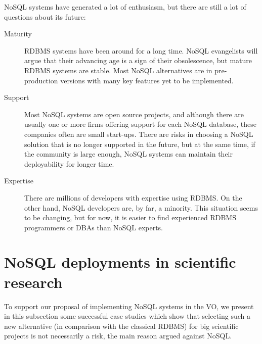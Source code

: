 NoSQL systems have generated a lot of enthusiasm, but there are still a lot of questions about its future:

\begin{description} %

\item[Maturity] %

RDBMS systems have been around for a long time. NoSQL evangelists will argue that their advancing age is a sign of their obsolescence, but mature RDBMS systems are stable. Most NoSQL alternatives are in pre-production versions with many key features yet to be implemented.

\item[Support] %

Most NoSQL systems are open source projects, and although there are usually one or more firms offering support for each NoSQL database, these companies often are small start-ups.
There are risks in choosing a NoSQL solution that is no longer supported in the future, but at the same time, if the community is large enough, NoSQL systems can maintain their deployability for longer time.

\item[Expertise] %

There are millions of developers with expertise using RDBMS. On
the %
other hand, NoSQL developers are, by far, a minority. This situation seems to
be changing, %
but for now, it is easier to find experienced RDBMS programmers or
DBAs %
than NoSQL experts.

\end{description} %


\section{NoSQL deployments in scientific research} %
\label{sec:nosql_deployments_in_scientific_research}

To support our proposal of implementing
NoSQL systems in the VO, %
we present in this
subsection
some successful case studies which show that selecting such a new alternative (in comparison with the classical RDBMS) 
for big scientific projects is
not necessarily %
a risk, the main reason argued
against NoSQL. %

